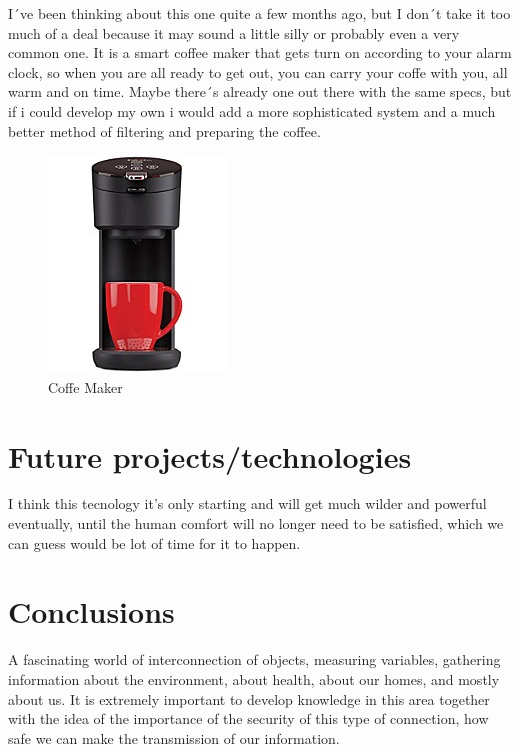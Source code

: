 \documentclass{IEEEtran}
\begin{document}
\begin{itemize}
     I´ve been thinking about this one quite a few months ago, but I don´t take it too much 
     of a deal because it may sound a little silly or probably even a very common one. It is a 
     smart coffee maker that gets turn on according to your alarm clock, so when you are all  
     ready to get out, you can carry your coffe with you, all warm and on time.
     Maybe there´s already one out there with the same specs, but if i could develop my own i would
     add a more sophisticated system and a much better method of filtering and preparing 
     the coffee.
     \begin{figure}
          \centering
          \includegraphics[width=3 cm]{coffeem.jpg}
          \caption{Coffe Maker}
          \label{thermalmonitoring}
     \end{figure}
     

\end{itemize}


\section{Future
projects/technologies}
I think this tecnology it's only starting and will get much wilder and powerful 
eventually, until the human comfort will no longer need to be satisfied, which 
we can guess would be lot of time for it to happen.


\section{Conclusions}

A fascinating world of interconnection of objects, measuring variables, gathering information about the environment, about health, about our homes, and mostly about us.
It is extremely important to develop knowledge in this area together with the idea of the importance of the security of this type of connection, how safe we can make the transmission of our information.
\end{document}
